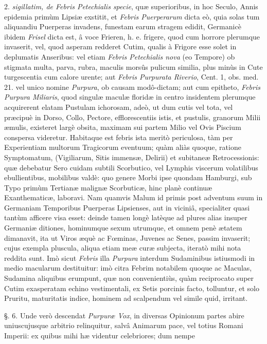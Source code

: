 \documentclass[a4paper, 11pt, oneside, polutonikogreek, german]{article}
\begin{document}
2. \emph{sigillatim, de Febris Petechialis specie}, quæ superioribus, in hoc Seculo, Annis epidemia primùm Lipsiæ exstitit, et \emph{Febris Puerperarum} dicta eò, quia solas tum aliquandiu Puerperas invadens, funestam earum stragem edidit, Germanicè ibidem \emph{Frisel} dicta est, â voce Frieren, h. e. frigere, quod cum horrore plerumque invaserit, vel, quod asperam redderet Cutim, qualis à Frigore esse solet in deplumatis Anseribus: vel etiam \emph{Febris Petechialis nova} (eo Tempore) ob stigmata multa, parva, rubra, maculis morsûs pulicum similia, plus minùs in Cute turgescentia cum calore urente; aut \emph{Febris Purpurata Riverio}, Cent. 1, obs. med. 21. vel unico nomine \emph{Purpura}, ob causam modô-dictam; aut cum epitheto, \emph{Febris Purpura Miliaris}, quod singulæ maculæ floridæ in centro insidentem plerumque acquirerent elatam Pustulam ichorosam, adeò, ut dum cutis vel tota, vel præcipuè in Dorso, Collo, Pectore, efflorescentiis istis, et pustulis, granorum Milii æmulis, existeret largè obsita, maximam sui partem Milio vel Ovis Piscium conspersa videretur. Habitaque est febris ista meritò periculosa, tàm per Experientiam multorum Tragicorum eventuum; quàm aliàs quoque, ratione Symptomatum, (Vigiliarum, Sitis immensæ, Delirii) et subitaneæ Retrocessionis: quæ debebatur Sero cuidam subtili Scorbutico, vel Lymphis viscerum volatilibus ebullientibus, mobilibus valdè: quo genere Morbi ipse quondam Hamburgi, sub Typo primùm Tertianæ malignæ Scorbuticæ, hinc planè continuæ Exanthematicæ, laboravi. Nam quamvis Malum id primis post adventum suum in Germaniam Temporibus Puerperas Lipsienses, aut in viciniâ, specialiter quasi tantùm afficere visa esset: deinde tamen longè latèque ad plures alias insuper Germaniæ ditiones, hominumque sexum utrumque, et omnem penè ætatem dimanavit, ita ut Viros æquè ac Fœminas, Juvenes ac Senes, passim invaserit; cujus exempla pluscula, aliqua etiam meæ curæ subjecta, iteratò mihi nota reddita sunt. Imò sicut \emph{Febris} illa \emph{Purpura} interdum Sudaminibus istiusmodi in medio macularum destituitur: imò citra Febrim notabilem quoque ac Maculas, Sudamina aliquibus erumpunt, quæ non convenientiùs, quàm reciprocato super Cutim exasperatam echino vestimentali, ex Setis porcinis facto, tolluntur, et solo Pruritu, maturitatis indice, hominem ad scalpendum vel simile quid, irritant.

§. 6. Unde verò descendat \emph{Purpuræ Vox}, in diversas Opinionum partes abire uniuscujusque arbitrio relinquitur, salvâ Animarum pace, vel totius Romani Imperii: ex quibus mihi hæ videntur celebriores; dum nempe
\end{document}
